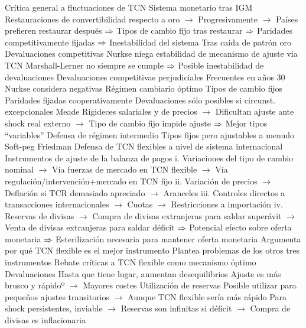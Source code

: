 \documentclass{nuevotema}
\begin{document}
\begin{esquemal}
				\4 Crítica general a fluctuaciones de TCN
				\4 Sistema monetario tras IGM
				\4[] Restauraciones de convertibilidad respecto a oro
				\4[] $\to$ Progresivamente
				\4[] $\to$ Países prefieren restaurar después
				\4[] $\Rightarrow$ Tipos de cambio fijo tras restaurar
				\4[] $\Rightarrow$ Paridades competitivamente fijadas
				\4[] $\Rightarrow$ Inestabilidad del sistema
				\4 Tras caída de patrón oro
				\4[] Devaluaciones competitivas
				\4 Nurkse niega estabilidad de mecanismo de ajuste vía TCN
				\4[] Marshall-Lerner no siempre se cumple
				\4[] $\Rightarrow$ Posible inestabilidad de devaluaciones
				\4 Devaluaciones competitivas perjudiciales
				\4[] Frecuentes en años 30
				\4[] Nurkse considera negativas
				\4 Régimen cambiario óptimo
				\4[] Tipos de cambio fijos
				\4[] Paridades fijadas cooperativamente
				\4[] Devaluaciones sólo posibles si circunst. excepcionales
			\3 Meade
				\4 Rigideces salariales y de precios
				\4[] $\to$ Dificultan ajuste ante shock real externo
				\4[] $\to$ Tipo de cambio fijo impide ajuste
				\4[] $\Rightarrow$ Mejor tipos ``variables''
				\4 Defensa de régimen intermedio
				\4[] Tipos fijos pero ajustables a menudo
				\4[] Soft-peg
			\3 Friedman
				\4 Defensa de TCN flexibles a nivel de sistema internacional
				\4 Instrumentos de ajuste de la balanza de pagos
				\4[] i. Variaciones del tipo de cambio nominal
				\4[] $\to$ Vía fuerzas de mercado en TCN flexible
				\4[] $\to$ Vía regulación/intervención+mercado en TCN fijo
				\4[] ii. Variación de precios
				\4[] $\to$ Deflación si TCR demasiado apreciado
				\4[] $\to$ Aranceles
				\4[] iii. Controles directos a transacciones internacionales
				\4[] $\to$ Cuotas
				\4[] $\to$ Restricciones a importación
				\4[] iv. Reservas de divisas
				\4[] $\to$ Compra de divisas extranjeras para saldar superávit
				\4[] $\to$ Venta de divisas extranjeras para saldar déficit
				\4[] $\Rightarrow$ Potencial efecto sobre oferta monetaria
				\4[] $\Rightarrow$ Esterilización necesaria para mantener oferta monetaria
				\4 Argumenta por qué TCN flexible es el mejor instrumento
				\4[] Plantea problemas de los otros tres instrumentos
				\4[] Rebate críticas a TCN flexible como mecanismo óptimo
				\4 Devaluaciones
				\4[] Hasta que tiene lugar, aumentan desequilibrios
				\4[] Ajuste es más brusco y rápidoº
				\4[] $\to$ Mayores costes
				\4 Utilización de reservas
				\4[] Posible utilizar para pequeños ajustes transitorios
				\4[] $\to$ Aunque TCN flexible sería más rápido
				\4[] Para shock persistentes, inviable
				\4[] $\to$ Reservas son infinitas si déficit
				\4[] $\to$ Compra de divisas es inflacionaria

\end{esquemal}
\end{document}

